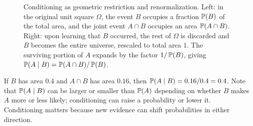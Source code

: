 \begin{figure}[H]
\caption{Conditioning as geometric restriction and renormalization. Left: in the original unit square $\Omega$, the event $B$ occupies a fraction $\P(B)$ of the total area, and the joint event $A \cap B$ occupies an area $\P(A \cap B)$. Right: upon learning that $B$ occurred, the rest of $\Omega$ is discarded and $B$ becomes the entire universe, rescaled to total area $1$. The surviving portion of $A$ expands by the factor $1/\P(B)$, giving $\P(A \given B) = \P(A \cap B)/\P(B)$.}
\label{ch04:fig-square}
\end{figure}

If $B$ has area $0.4$ and $A\cap B$ has area $0.16$, then $\P(A\given B) = 0.16/0.4 = 0.4$. Note that $\P(A\given B)$ can be larger or smaller than $\P(A)$ depending on whether $B$ makes $A$ more or less likely; conditioning can raise a probability or lower it. Conditioning matters because new evidence can shift probabilities in either direction.

